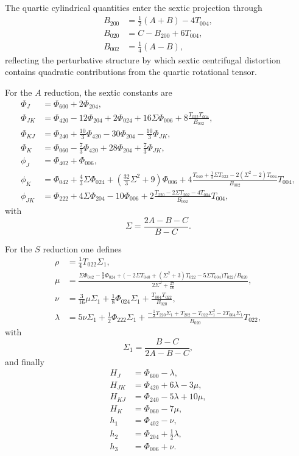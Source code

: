 The quartic cylindrical quantities enter the sextic projection through
\begin{align}
B_{200} &= \frac{1}{2}(A+B)-4T_{004},\\
B_{020} &= C-B_{200}+6T_{004},\\
B_{002} &= \frac{1}{4}(A-B),
\end{align}
reflecting the perturbative structure by which sextic centrifugal distortion
contains quadratic contributions from the quartic rotational tensor.

For the $A$ reduction, the sextic constants are
\begin{align}
\Phi_J &= \Phi_{600}+2\Phi_{204},\\
\Phi_{JK} &= \Phi_{420}-12\Phi_{204}+2\Phi_{024}
+16\Sigma\Phi_{006}
+8\frac{T_{022}T_{004}}{B_{002}},\\
\Phi_{KJ} &= \Phi_{240}+\frac{10}{3}\Phi_{420}
-30\Phi_{204}-\frac{10}{3}\Phi_{JK},\\
\Phi_K &= \Phi_{060}-\frac{7}{3}\Phi_{420}
+28\Phi_{204}+\frac{7}{3}\Phi_{JK},\\
\phi_J &= \Phi_{402}+\Phi_{006},\\
\phi_K &= \Phi_{042}+\frac{4}{3}\Sigma\Phi_{024}
+\left(\frac{32}{3}\Sigma^2+9\right)\Phi_{006}
+4\frac{T_{040}+\frac{1}{3}\Sigma T_{022}
-2(\Sigma^2-2)T_{004}}{B_{002}}T_{004},\\
\phi_{JK} &= \Phi_{222}+4\Sigma\Phi_{204}-10\Phi_{006}
+2\frac{T_{220}-2\Sigma T_{202}-4T_{004}}{B_{002}}T_{004},
\end{align}
with
\begin{equation}
\Sigma=\frac{2A-B-C}{B-C}.
\end{equation}

For the $S$ reduction one defines
\begin{align}
\rho &= \frac{1}{4}T_{022}\Sigma_1,\\
\mu &= \frac{\Sigma\Phi_{042}-\frac{9}{8}\Phi_{024}
+\bigl(-2\Sigma T_{040}+(\Sigma^2+3)T_{022}-5\Sigma T_{004}\bigr)
T_{022}/B_{020}}
{2\Sigma^2+\frac{27}{16}},\\
\nu &= \frac{3}{16}\mu\Sigma_1+\frac{1}{8}\Phi_{024}\Sigma_1
+\frac{T_{004}T_{022}}{B_{020}},\\
\lambda &= 5\nu\Sigma_1+\frac{1}{2}\Phi_{222}\Sigma_1
+\frac{-\frac{1}{2}T_{220}\Sigma_1+T_{202}-T_{022}\Sigma_1^2
-2T_{004}\Sigma_1}{B_{020}}T_{022},
\end{align}
with
\begin{equation}
\Sigma_1=\frac{B-C}{2A-B-C},
\end{equation}
and finally
\begin{align}
H_J &= \Phi_{600}-\lambda,\\
H_{JK} &= \Phi_{420}+6\lambda-3\mu,\\
H_{KJ} &= \Phi_{240}-5\lambda+10\mu,\\
H_K &= \Phi_{060}-7\mu,\\
h_1 &= \Phi_{402}-\nu,\\
h_2 &= \Phi_{204}+\frac{1}{2}\lambda,\\
h_3 &= \Phi_{006}+\nu.
\end{align}

